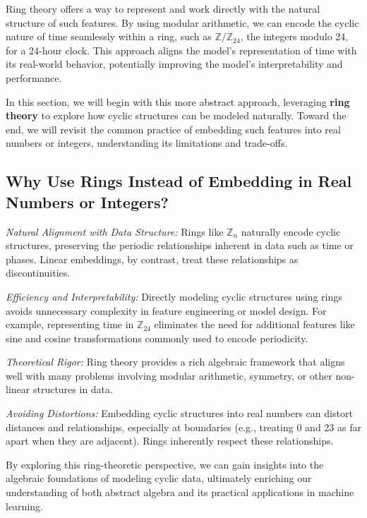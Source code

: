 Ring theory offers a way to represent and work directly with the natural structure of such features. By using modular arithmetic, we can encode the cyclic nature of time seamlessly within a ring, such as $\mathbb{Z}/\mathbb{Z}_{24}$, the integers modulo 24, for a 24-hour clock. This approach aligns the model's representation of time with its real-world behavior, potentially improving the model's interpretability and performance.

In this section, we will begin with this more abstract approach, leveraging \textbf{ring theory} to explore how cyclic structures can be modeled naturally. Toward the end, we will revisit the common practice of embedding such features into real numbers or integers, understanding its limitations and trade-offs.

\subsection*{Why Use Rings Instead of Embedding in Real Numbers or Integers?}

\emph{Natural Alignment with Data Structure:} Rings like $\mathbb{Z}_{n}$ naturally encode cyclic structures, preserving the periodic relationships inherent in data such as time or phases. Linear embeddings, by contrast, treat these relationships as discontinuities.

\emph{Efficiency and Interpretability:} Directly modeling cyclic structures using rings avoids unnecessary complexity in feature engineering or model design. For example, representing time in $\mathbb{Z}_{24}$ eliminates the need for additional features like sine and cosine transformations commonly used to encode periodicity.

\emph{Theoretical Rigor:} Ring theory provides a rich algebraic framework that aligns well with many problems involving modular arithmetic, symmetry, or other non-linear structures in data.

\emph{Avoiding Distortions:} Embedding cyclic structures into real numbers can distort distances and relationships, especially at boundaries (e.g., treating 0 and 23 as far apart when they are adjacent). Rings inherently respect these relationships.

By exploring this ring-theoretic perspective, we can gain insights into the algebraic foundations of modeling cyclic data, ultimately enriching our understanding of both abstract algebra and its practical applications in machine learning.

